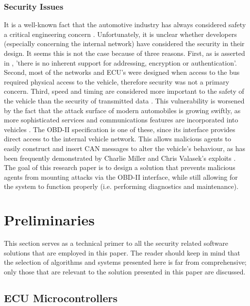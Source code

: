 \subsubsection{Security Issues}
\label{subsec:obd:security_issues}

It is a well-known fact that the automotive industry has always considered safety a critical engineering concern \cite{Dyer}. Unfortunately, it is unclear whether developers (especially concerning the internal network) have considered the security in their design. It seems this is not the case because of three reasons. First, as is asserted in \cite{MillerB}, 'there is no inherent support for addressing, encryption or authentication'. Second, most of the networks and ECU's were designed when access to the bus required physical access to the vehicle, therefore security was not a primary concern. Third, speed and timing are considered more important to the safety of the vehicle than the security of transmitted data \cite{Klinedinst05}. This vulnerability is worsened by the fact that the attack surface of modern automobiles is growing swiftly, as more sophisticated services and communications features are incorporated into vehicles \cite{Kosher}. The OBD-II specification is one of these, since its interface provides direct access to the internal vehicle network. This allows malicious agents to easily construct and insert CAN messages to alter the vehicle's behaviour, as has been frequently demonstrated by Charlie Miller and Chris Valasek's exploits \cite{MillerA, MillerB, MillerC}. The goal of this research paper is to design a solution that prevents malicious agents from mounting attacks via the OBD-II interface, while still allowing for the system to function properly (i.e. performing diagnostics and maintenance). 

\section{Preliminaries}
\label{chap:preliminaries}

This section serves as a technical primer to all the security related software solutions that are employed in this paper. The reader should keep in mind that the selection of algorithms and systems presented here is far from comprehensive; only those that are relevant to the solution presented in this paper are discussed.

\subsection{ECU Microcontrollers}
\label{sec:microcontrollers}


